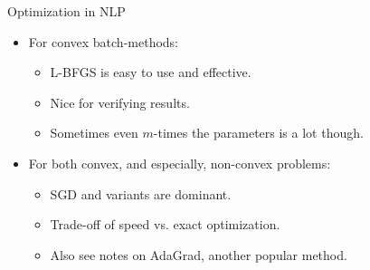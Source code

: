 \documentclass{beamer}
\begin{document}
\begin{frame}{Optimization in NLP}
  \begin{itemize}
  \item For convex batch-methods:
    \begin{itemize}
    \item L-BFGS is easy to use and effective. 
    \item Nice for verifying results.
    \item Sometimes even $m$-times the parameters is a lot though.
    \end{itemize}
    
\air

  \item For both convex, and especially, non-convex problems:
    \begin{itemize}
    \item SGD and variants are dominant.
    \item Trade-off of speed vs. exact optimization.
    \item Also see notes on AdaGrad, another popular method.
    \end{itemize}
  \end{itemize}
\end{frame}
\end{document}
